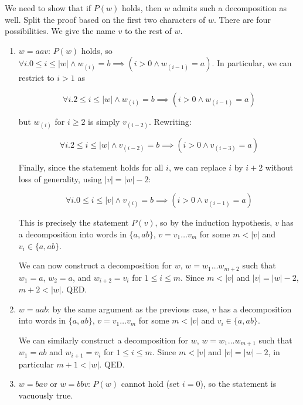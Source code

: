 \begin{exercise}{}
\begin{solution}
    We need to show that if \(P(w)\) holds, then \(w\) admits such a
    decomposition as well. Split the proof based on the first two characters of
    \(w\). There are four possibilities. We give the name \(v\) to the rest of
    \(w\).

    \begin{enumerate}
      \item \(w = aav\): \(P(w)\) holds, so \(\forall i. 0 \le i \le |w| \land
      w_{(i)} = b \implies (i > 0 \land w_{(i - 1)} = a)\). In particular, we
      can restrict to \(i > 1\) as

      \begin{equation*}
        \forall i. 2 \le i \le |w| \land w_{(i)} = b \implies (i > 0 \land w_{(i - 1)} = a)
      \end{equation*}

      but \(w_{(i)}\) for \(i \geq 2\) is simply \(v_{(i - 2)}\). Rewriting:

      \begin{equation*}
        \forall i. 2 \le i \le |w| \land v_{(i - 2)} = b \implies (i > 0 \land v_{(i - 3)} = a)
      \end{equation*}

      Finally, since the statement holds for all \(i\), we can replace \(i\) by
      \(i + 2\) without loss of generality, using \(|v| = |w| - 2\):

      \begin{equation*}
        \forall i. 0 \le i \le |v| \land v_{(i)} = b \implies (i > 0 \land v_{(i - 1)} = a)
      \end{equation*}

      This is precisely the statement \(P(v)\), so by the induction hypothesis,
      \(v\) has a decomposition into words in \(\{a, ab\}\), \(v = v_1\ldots
      v_m\) for some \(m < |v|\) and \(v_i \in \{a, ab\}\).

      We can now construct a decomposition for \(w\), \(w = w_1\ldots w_{m+2}\)
      such that \(w_1 = a\), \(w_2 = a\), and \(w_{i + 2} = v_i\) for \(1 \le i
      \le m\). Since \(m < |v|\) and \(|v| = |w| - 2\), \(m + 2 < |w|\). QED.

      \item \(w = aab\): by the same argument as the previous case, \(v\) has a decomposition
      into words in \(\{a, ab\}\), \(v = v_1\ldots v_m\) for some \(m < |v|\)
      and \(v_i \in \{a, ab\}\). 
      
      We can similarly construct a decomposition for \(w\), \(w = w_1\ldots
      w_{m+1}\) such that \(w_1 = ab\) and \(w_{i + 1} = v_i\) for \(1 \le i \le
      m\). Since \(m < |v|\) and \(|v| = |w| - 2\), in particular \(m + 1 <
      |w|\). QED.

      \item \(w = bav\) or \(w = bbv\): \(P(w)\) cannot hold (set \(i = 0\)), so
      the statement is vacuously true. 
    \end{enumerate}
  \end{solution}
  
\end{exercise}
